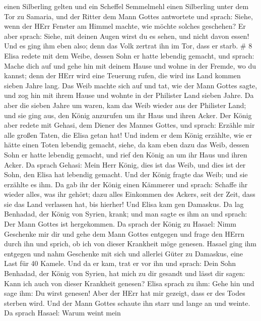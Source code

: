 einen Silberling gelten und ein Scheffel Semmelmehl einen Silberling
unter dem Tor zu Samaria,  und der Ritter dem Mann Gottes
antwortete und sprach: Siehe, wenn der HErr Fenster am Himmel machte,
wie möchte solches geschehen? Er aber sprach: Siehe, mit deinen Augen
wirst du es sehen, und nicht davon essen!  Und es ging ihm
eben also; denn das Volk zertrat ihn im Tor, dass er starb. \# 8
 Elisa redete mit dem Weibe, dessen Sohn er hatte lebendig
gemacht, und sprach: Mache dich auf und gehe hin mit deinem Hause und
wohne in der Fremde, wo du kannst; denn der HErr wird eine Teuerung
rufen, die wird ins Land kommen sieben Jahre lang.  Das Weib
machte sich auf und tat, wie der Mann Gottes sagte, und zog hin mit
ihrem Hause und wohnte in der Philister Land sieben Jahre. 
Da aber die sieben Jahre um waren, kam das Weib wieder aus der Philister
Land; und sie ging aus, den König anzurufen um ihr Haus und ihren Acker.
 Der König aber redete mit Gehasi, dem Diener des Mannes
Gottes, und sprach: Erzähle mir alle großen Taten, die Elisa getan hat!
 Und indem er dem König erzählte, wie er hätte einen Toten
lebendig gemacht, siehe, da kam eben dazu das Weib, dessen Sohn er hatte
lebendig gemacht, und rief den König an um ihr Haus und ihren Acker. Da
sprach Gehasi: Mein Herr König, dies ist das Weib, und dies ist der
Sohn, den Elisa hat lebendig gemacht.  Und der König fragte
das Weib; und sie erzählte es ihm. Da gab ihr der König einen Kämmerer
und sprach: Schaffe ihr wieder alles, was ihr gehört; dazu alles
Einkommen des Ackers, seit der Zeit, dass sie das Land verlassen hat,
bis hierher!  Und Elisa kam gen Damaskus. Da lag Benhadad,
der König von Syrien, krank; und man sagte es ihm an und sprach: Der
Mann Gottes ist hergekommen.  Da sprach der König zu Hasael:
Nimm Geschenke mir dir und gehe dem Mann Gottes entgegen und frage den
HErrn durch ihn und sprich, ob ich von dieser Krankheit möge genesen.
 Hasael ging ihm entgegen und nahm Geschenke mit sich und
allerlei Güter zu Damaskus, eine Last für 40 Kamele. Und da er kam, trat
er vor ihn und sprach: Dein Sohn Benhadad, der König von Syrien, hat
mich zu dir gesandt und lässt dir sagen: Kann ich auch von dieser
Krankheit genesen?  Elisa sprach zu ihm: Gehe hin und sage
ihm: Du wirst genesen! Aber der HErr hat mir gezeigt, dass er des Todes
sterben wird.  Und der Mann Gottes schaute ihn starr und
lange an und weinte.  Da sprach Hasael: Warum weint mein
